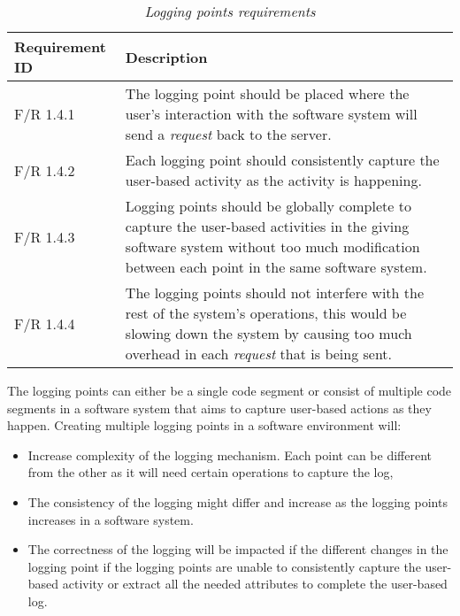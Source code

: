 \begin{table}[!htb]
	\centering
	\caption[Logging points requirements]
	{\textit{Logging points requirements}}
	\label{tbl:ch2_loggingPointRequirement}
	\begin{tabularx}{\textwidth}{|l|X|}
		\hline \textbf{Requirement ID} & \textbf{Description} \\
		\hline F/R 1.4.1 & The logging point should be placed where the user's interaction with the software system will send a \textit{request} back to the server.\\
		\hline F/R 1.4.2 & Each logging point should consistently capture the user-based activity as the activity is happening. \\
		\hline F/R 1.4.3 & Logging points should be globally complete to capture the user-based activities in the giving software system without too much modification between each point in the same
		software system. \\
		\hline F/R 1.4.4 & The logging points should not interfere with the rest of the system's operations, this would be slowing down the system by causing too much overhead in each \textit{request}
		that is being sent. \\
		\hline
	\end{tabularx}
\end{table}

The logging points can either be a single code segment or consist of multiple code segments in a software system that aims to capture user-based actions as they happen. Creating multiple logging points in a software environment will:

\begin{itemize}
	\item Increase complexity of the logging mechanism. Each point can be different from the other as it will need certain operations to capture the log,
	\item The consistency of the logging might differ and increase as the logging points increases in a software system. 
	\item The correctness of the logging will be impacted if the different changes in the logging point if the logging points are unable to consistently capture the user-based activity or extract all the needed attributes to complete the user-based log.
\end{itemize}

